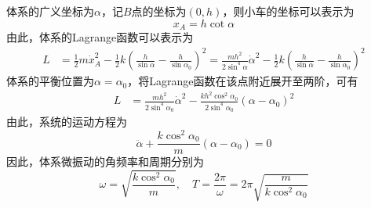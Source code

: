 \begin{solution}
体系的广义坐标为$\alpha$，记$B$点的坐标为$(0,h)$，则小车的坐标可以表示为
\begin{equation*}
	x_A = h\cot \alpha
\end{equation*}
由此，体系的Lagrange函数可以表示为
\begin{align*}
	L & = \frac12 m \dot{x}_A^2 - \frac12 k \left(\frac{h}{\sin \alpha} - \frac{h}{\sin \alpha_0}\right)^2 = \frac{mh^2}{2\sin^4 \alpha} \dot{\alpha}^2 - \frac12 k \left(\frac{h}{\sin \alpha} - \frac{h}{\sin \alpha_0}\right)^2
\end{align*}
体系的平衡位置为$\alpha = \alpha_0$，将Lagrange函数在该点附近展开至两阶，可有
\begin{align*}
	L & = \frac{mh^2}{2\sin^4 \alpha_0} \dot{\alpha}^2 - \frac{kh^2 \cos^2 \alpha_0}{2 \sin^4 \alpha_0}(\alpha-\alpha_0)^2 
\end{align*}
由此，系统的运动方程为
\begin{equation*}
	\ddot{\alpha} + \frac{k\cos^2 \alpha_0}{m} (\alpha-\alpha_0) = 0
\end{equation*}
因此，体系微振动的角频率和周期分别为
\begin{equation*}
	\omega = \sqrt{\frac{k\cos^2 \alpha_0}{m}},\quad T = \frac{2\pi}{\omega} = 2\pi \sqrt{\frac{m}{k\cos^2 \alpha_0}}
\end{equation*}
\end{solution}

